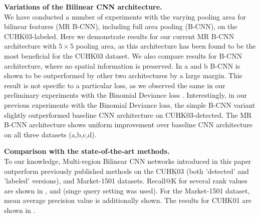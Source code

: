 \indent\textbf{Variations of the Bilinear CNN architecture.} \\
We have conducted a number of experiments with the varying pooling area for bilinear features (MR B-CNN), including full area pooling (B-CNN), on the CUHK03-labeled.  Here we demonstrate results for our current MR B-CNN architecture with $5\times5$ pooling area, as this architecture has been found to be the most beneficial for the CUHK03 dataset.
We also compare results for B-CNN architecture, where no spatial information is preserved. In a and b B-CNN is shown to be outperformed by other two architectures by a large margin. This result is not specific to a particular loss, as we observed the same in our preliminary experiments with the Binomial Deviance loss  \citep{yi2014deep}. Interestingly, in our previous experiments with the Binomial Deviance loss, the simple B-CNN variant slightly outperformed baseline CNN architecture on  CUHK03-detected.
The MR B-CNN architecture shows uniform improvement over baseline CNN architecture on all three datasets (a,b,c,d).




\indent\textbf{Comparison with the state-of-the-art methods.} \\
To our knowledge, Multi-region Bilinear CNN networks introduced in this paper outperform previously published methods on the CUHK03 (both 'detected' and 'labeled' versions), and Market-1501 datasets. Recall@K for several rank values are shown in ,  and  (singe query setting was used). For the Market-1501 dataset, mean average precision value is additionally shown. The results for CUHK01 are shown in . 






